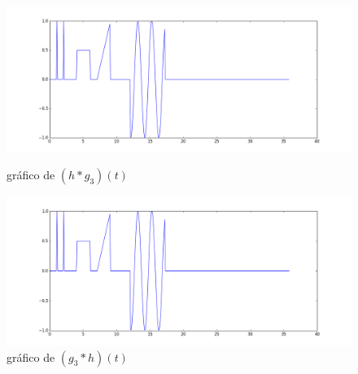 \documentclass[12pt]{article}
\begin{document}
\begin{figure}[!h]
	\centering
	\begin{minipage}[b]{0.49\linewidth}
		\includegraphics[width=1.15\linewidth]{h*g3.png}
		\caption{gráfico de $(h*g_3)(t)$}
	\end{minipage}
	\hfill
	\begin{minipage}[b]{0.49\linewidth}
		\includegraphics[width=1.15\linewidth]{g3*h.png}
		\caption{gráfico de $(g_3*h)(t)$}
	\end{minipage}
\end{figure}
\end{document}
